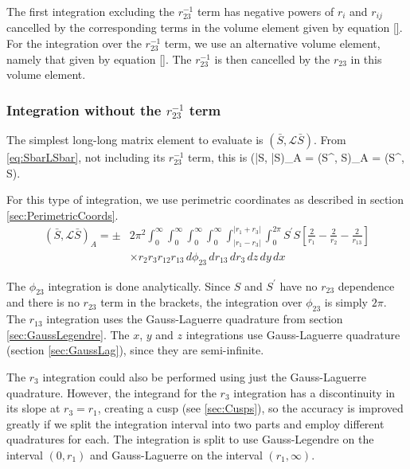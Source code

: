 \documentclass[Dissertation.tex]{subfiles}
\begin{document}
The first integration excluding the $r_{23}^{-1}$ term has negative powers of 
$r_i$ and $r_{ij}$ cancelled by the corresponding terms in the volume element 
given by equation \ref{}.  For the integration over the $r_{23}^{-1}$ term, 
we use an alternative volume element, namely that given by equation \ref{}.  
The $r_{23}^{-1}$ is then cancelled by the $r_{23}$ in this volume element.


\subsubsection{Integration without the \texorpdfstring{$r_{23}^{-1}$} {1/r23} term}
\label{sec:LongLongNoR23}
The simplest long-long matrix element to evaluate is $(\bar{S},\mathcal{L} \bar{S})$.  From \cref{eq:SbarLSbar}, not including its $r_{23}^{-1}$ term, this is
\beq
(\bar{S}, \bar{S})_A = \pm \left(S^\prime, S\right)_A = \pm \left(S^\prime,  S\right).
\eeq

For this type of integration, we use perimetric coordinates as described in section \ref{sec:PerimetricCoords}.
\begin{align}
\label{eq:SBarSBarInt}
(\bar{S},\mathcal{L} \bar{S})_A = \pm &2\pi^2 \int_0^\infty \int_0^\infty \int_0^\infty \int_0^\infty \int_{|r_1 - r_3|}^{|r_1 + r_3|} \int_0^{2\pi}  S^\prime S \left[ \frac{2}{r_1} - \frac{2}{r_2} - \frac{2}{r_{13}}\right] \\
&\times r_2 r_3 r_{12} r_{13}\, d\phi_{23}\, dr_{13}\, dr_3\, dz\, dy\, dx
\end{align}

The $\phi_{23}$ integration is done analytically. Since $S$ and $S^\prime$ have no $r_{23}$ dependence and there is no $r_{23}$ term in the brackets, the integration over $\phi_{23}$ is simply $2\pi$.  The $r_{13}$ integration uses the Gauss-Laguerre quadrature from section \ref{sec:GaussLegendre}. The $x$, $y$ and $z$ integrations use Gauss-Laguerre quadrature (section \ref{sec:GaussLag}), since they are semi-infinite.

The $r_3$ integration could also be performed using just the Gauss-Laguerre 
quadrature. However, the integrand for the $r_3$ integration has a 
discontinuity in its slope at $r_3=r_1$, creating a cusp
(see \cref{sec:Cusps}), so the accuracy is improved greatly if we split the
integration interval into two parts and employ different quadratures for each.
The integration is split to use Gauss-Legendre on the interval $(0,r_1)$ and
Gauss-Laguerre on the interval $(r_1,\infty)$.
\end{document}

